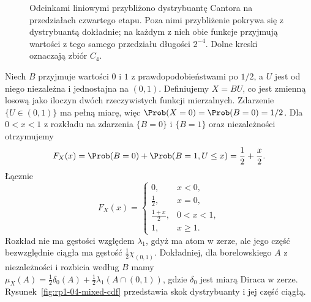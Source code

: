 \begin{figure}[htbp]
\caption{Odcinkami liniowymi przybliżono dystrybuantę Cantora
na przedziałach czwartego etapu. Poza nimi przybliżenie
pokrywa się z dystrybuantą dokładnie; na każdym z nich
obie funkcje przyjmują wartości z tego samego przedziału
długości $2^{-4}$. Dolne kreski oznaczają zbiór $C_4$.}
\label{fig:rp1-04-cantor-cdf}
\end{figure}


\begin{przyklad}
Niech $B$ przyjmuje wartości $0$ i $1$ z prawdopodobieństwami po $1/2$,
a $U$ jest od niego niezależna i jednostajna na $(0,1)$.
Definiujemy $X=BU$, co jest zmienną losową jako iloczyn
dwóch rzeczywistych funkcji mierzalnych.
Zdarzenie $\{U\in(0,1)\}$ ma pełną
miarę, więc $\Prob(X=0)=\Prob(B=0)=1/2$.
Dla $0<x<1$ z rozkładu na zdarzenia $\{B=0\}$ i $\{B=1\}$
oraz niezależności otrzymujemy
\[
F_X(x)=\Prob(B=0)+\Prob(B=1,U\leq x)=\frac12+\frac{x}{2}.
\] Łącznie
\[
F_X(x)=\begin{cases}
0,&x<0,\\
\frac12,&x=0,\\
\frac{1+x}{2},&0<x<1,\\
1,&x\geq1.
\end{cases}
\]
Rozkład nie ma gęstości względem $\lambda_1$, gdyż ma atom w zerze,
ale jego część bezwzględnie ciągła ma gęstość
$\frac12\chi_{(0,1)}$. Dokładniej, dla borelowskiego $A$
z niezależności i rozbicia według $B$ mamy
$\mu_X(A)=\frac12\delta_0(A)+\frac12\lambda_1(A\cap(0,1))$,
gdzie $\delta_0$ jest miarą Diraca w zerze.
Rysunek~\ref{fig:rp1-04-mixed-cdf} przedstawia skok dystrybuanty i jej część ciągłą.
\end{przyklad}

